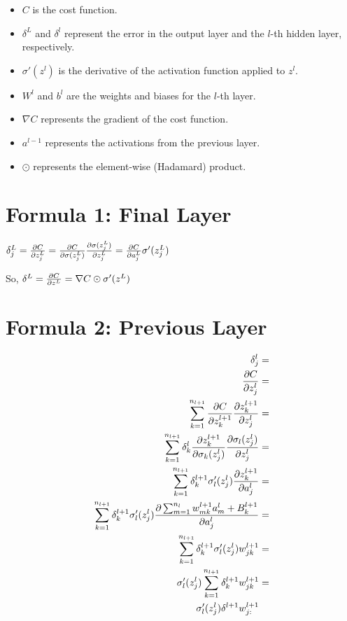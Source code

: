 \documentclass{article}
\begin{document}
\begin{itemize}
    \item \( C \) is the cost function.
    \item \( \delta^L \) and \( \delta^l \) represent the error in the output layer and the \( l \)-th hidden layer, respectively.
    \item \( \sigma'(z^l) \) is the derivative of the activation function applied to \( z^l \).
    \item \( W^l \) and \( b^l \) are the weights and biases for the \( l \)-th layer.
    \item \( \nabla C \) represents the gradient of the cost function.
    \item \( a^{l-1} \) represents the activations from the previous layer.
    \item \( \odot \) represents the element-wise (Hadamard) product.
\end{itemize}

\section*{Formula 1: Final Layer}
$\delta_j^L = \pdv{C}{z_j^L} = \pdv{C}{\sigma(z_j^L)} \pdv{\sigma(z_j^L)}{z_j^L} = \pdv{C}{a_j^L} \sigma^\prime(z_j^L)$

So, 
$\delta^L = \pdv{C}{z^L} = \nabla C \odot \sigma^\prime(z^L)$

\section*{Formula 2: Previous Layer}
\begin{align*}
    \delta_j^l &= \\
    \pdv{C}{z_j^l} &= \\
    \sum_{k=1}^{n_{l+1}} \pdv{C}{z_k^{l+1}} \pdv{z_k^{l+1}}{z_j^l} &= \\ \sum_{k=1}^{n_{l+1}} \delta_k^l \pdv{z_k^{l+1}}{\sigma_k(z_j^l)} \pdv{\sigma_l(z_j^l)}{z_j^l} &= \\
    \sum_{k=1}^{n_{l+1}} \delta_k^{l+1} \sigma^\prime_l(z_j^l) \pdv{z_k^{l+1}}{a_j^l} &= \\
    \sum_{k=1}^{n_{l+1}} \delta_k^{l+1} \sigma^\prime_l(z_j^l) \pdv{\sum_{m=1}^{n_l} w_{mk}^{l+1}a_m^l + B_k^{l+1}}{a_j^l} &= \\
    \sum_{k=1}^{n_{l+1}} \delta_k^{l+1} \sigma^\prime_l(z_j^l) w^{l+1}_{jk} &= \\
    \sigma^\prime_l(z_j^l) \sum_{k=1}^{n_{l+1}} \delta_k^{l+1}  w^{l+1}_{jk} &= \\
    \sigma^\prime_l(z_j^l) \delta^{l+1} w_{j:}^{l+1}
\end{align*}
\end{document}
